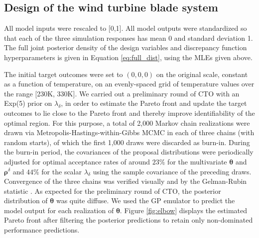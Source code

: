 \documentclass[12pt]{article}
\begin{document}
\subsection{Design of the wind turbine blade system}\label{the_model}
%
All model inputs were rescaled to [0,1]. 
%
All model outputs were standardized so that each of the three simulation responses has mean 0 and standard deviation 1.
%
The full joint posterior density of the design variables and discrepancy function hyperparameters is given in Equation \eqref{eq:full_dist}, using the MLEs given above.
%

The initial target outcomes were set to $(0,0,0)$ on the original scale, constant as a function of temperature, on an evenly-spaced grid of temperature values over the range [230K, 330K].
%
We carried out a preliminary round of CTO with an Exp(5) prior on $\lambda_\delta$, in order to estimate the Pareto front and update the target outcomes to lie close to the Pareto front and thereby improve identifiability of the optimal region.
%
For this purpose, a total of 2,000 Markov chain realizations were drawn via Metropolis-Hastings-within-Gibbs MCMC \citep{Metropolis1953, Hastings1970, Geman1984} in each of three chains (with random starts), of which the first 1,000 draws were discarded as burn-in. 
%
During the burn-in period, the covariances of the proposal distributions were periodically adjusted for optimal acceptance rates of around $23\%$ for the multivariate $\boldsymbol \theta$ and $\boldsymbol\rho^\delta$ \citep{Roberts1997} and $44\%$ for the scalar $\lambda_\delta$ \citep[][p. 296]{Gelman2013} using the sample covariance of the preceding draws. %
%
%
%
Convergence of the three chains was verified visually and by the Gelman-Rubin statistic \citep[$\approx1.01$;][]{Gelman1992a}.
%
As expected for the preliminary round of CTO, the posterior distribution of $\boldsymbol\theta$ was quite diffuse.
%
We used the GP emulator to predict the model output for each realization of $\boldsymbol \theta$.
%
Figure \ref{fig:elbow} displays the estimated Pareto front after filtering the posterior predictions to retain only non-dominated performance predictions.
%
\end{document}
